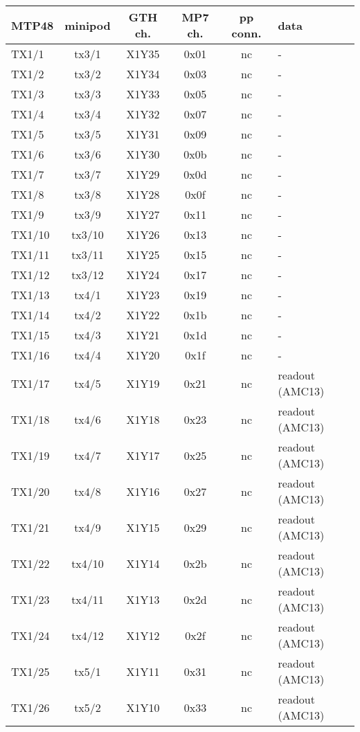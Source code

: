 \begin{longtable}{|l|c|c|c|c|l|}
\hline
\textbf{MTP48}& \textbf{minipod}& \textbf{GTH ch.}& \textbf{MP7 ch.} &\textbf{pp conn.}& \textbf{data}\\
\hline
\hline
\endhead
TX1/1  & tx3/1  & X1Y35 & 0x01 & nc & -\\\hline
TX1/2  & tx3/2  & X1Y34 & 0x03 & nc & -\\\hline
TX1/3  & tx3/3  & X1Y33 & 0x05 & nc & -\\\hline
TX1/4  & tx3/4  & X1Y32 & 0x07 & nc & -\\\hline
TX1/5  & tx3/5  & X1Y31 & 0x09 & nc & -\\\hline
TX1/6  & tx3/6  & X1Y30 & 0x0b & nc & -\\\hline
TX1/7  & tx3/7  & X1Y29 & 0x0d & nc & -\\\hline
TX1/8  & tx3/8  & X1Y28 & 0x0f & nc & -\\\hline
TX1/9  & tx3/9  & X1Y27 & 0x11 & nc & -\\\hline
TX1/10 & tx3/10 & X1Y26 & 0x13 & nc & -\\\hline
TX1/11 & tx3/11 & X1Y25 & 0x15 & nc & -\\\hline
TX1/12 & tx3/12 & X1Y24 & 0x17 & nc & -\\\hline
TX1/13 & tx4/1  & X1Y23 & 0x19 & nc & -\\\hline
TX1/14 & tx4/2  & X1Y22 & 0x1b & nc & -\\\hline
TX1/15 & tx4/3  & X1Y21 & 0x1d & nc & -\\\hline
TX1/16 & tx4/4  & X1Y20 & 0x1f & nc & -\\\hline
TX1/17 & tx4/5  & X1Y19 & 0x21 & nc & readout (AMC13)\\\hline
TX1/18 & tx4/6  & X1Y18 & 0x23 & nc & readout (AMC13)\\\hline
TX1/19 & tx4/7  & X1Y17 & 0x25 & nc & readout (AMC13)\\\hline
TX1/20 & tx4/8  & X1Y16 & 0x27 & nc & readout (AMC13)\\\hline
TX1/21 & tx4/9  & X1Y15 & 0x29 & nc & readout (AMC13)\\\hline
TX1/22 & tx4/10 & X1Y14 & 0x2b & nc & readout (AMC13)\\\hline
TX1/23 & tx4/11 & X1Y13 & 0x2d & nc & readout (AMC13)\\\hline
TX1/24 & tx4/12 & X1Y12 & 0x2f & nc & readout (AMC13)\\\hline
TX1/25 & tx5/1  & X1Y11 & 0x31 & nc & readout (AMC13)\\\hline
TX1/26 & tx5/2  & X1Y10 & 0x33 & nc & readout (AMC13)\\\hline

\end{longtable}
